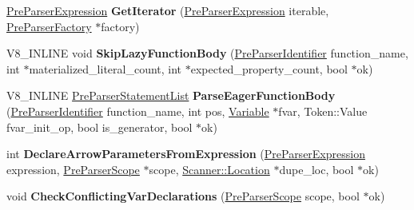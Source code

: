 \begin{DoxyCompactItemize}
\item 
\hypertarget{classv8_1_1internal_1_1_pre_parser_traits_a055c44dcf6be07532e81e06cd76797b5}{}\hyperlink{classv8_1_1internal_1_1_pre_parser_expression}{Pre\+Parser\+Expression} {\bfseries Get\+Iterator} (\hyperlink{classv8_1_1internal_1_1_pre_parser_expression}{Pre\+Parser\+Expression} iterable, \hyperlink{classv8_1_1internal_1_1_pre_parser_factory}{Pre\+Parser\+Factory} $\ast$factory)\label{classv8_1_1internal_1_1_pre_parser_traits_a055c44dcf6be07532e81e06cd76797b5}

\item 
\hypertarget{classv8_1_1internal_1_1_pre_parser_traits_a4f84bed6ca652abd6d231d1cded66c5e}{}V8\+\_\+\+I\+N\+L\+I\+N\+E void {\bfseries Skip\+Lazy\+Function\+Body} (\hyperlink{classv8_1_1internal_1_1_pre_parser_identifier}{Pre\+Parser\+Identifier} function\+\_\+name, int $\ast$materialized\+\_\+literal\+\_\+count, int $\ast$expected\+\_\+property\+\_\+count, bool $\ast$ok)\label{classv8_1_1internal_1_1_pre_parser_traits_a4f84bed6ca652abd6d231d1cded66c5e}

\item 
\hypertarget{classv8_1_1internal_1_1_pre_parser_traits_a44ba9cde36cccdd479ebc57026ff8d8c}{}V8\+\_\+\+I\+N\+L\+I\+N\+E \hyperlink{classv8_1_1internal_1_1_pre_parser_statement_list}{Pre\+Parser\+Statement\+List} {\bfseries Parse\+Eager\+Function\+Body} (\hyperlink{classv8_1_1internal_1_1_pre_parser_identifier}{Pre\+Parser\+Identifier} function\+\_\+name, int pos, \hyperlink{classv8_1_1internal_1_1_variable}{Variable} $\ast$fvar, Token\+::\+Value fvar\+\_\+init\+\_\+op, bool is\+\_\+generator, bool $\ast$ok)\label{classv8_1_1internal_1_1_pre_parser_traits_a44ba9cde36cccdd479ebc57026ff8d8c}

\item 
\hypertarget{classv8_1_1internal_1_1_pre_parser_traits_ad7231eb53773c0cc524ae7e9a3cd0571}{}int {\bfseries Declare\+Arrow\+Parameters\+From\+Expression} (\hyperlink{classv8_1_1internal_1_1_pre_parser_expression}{Pre\+Parser\+Expression} expression, \hyperlink{classv8_1_1internal_1_1_pre_parser_scope}{Pre\+Parser\+Scope} $\ast$scope, \hyperlink{structv8_1_1internal_1_1_scanner_1_1_location}{Scanner\+::\+Location} $\ast$dupe\+\_\+loc, bool $\ast$ok)\label{classv8_1_1internal_1_1_pre_parser_traits_ad7231eb53773c0cc524ae7e9a3cd0571}

\item 
\hypertarget{classv8_1_1internal_1_1_pre_parser_traits_a1cb13441c27012203887d847142edfb8}{}void {\bfseries Check\+Conflicting\+Var\+Declarations} (\hyperlink{classv8_1_1internal_1_1_pre_parser_scope}{Pre\+Parser\+Scope} scope, bool $\ast$ok)\label{classv8_1_1internal_1_1_pre_parser_traits_a1cb13441c27012203887d847142edfb8}


\end{DoxyCompactItemize}
